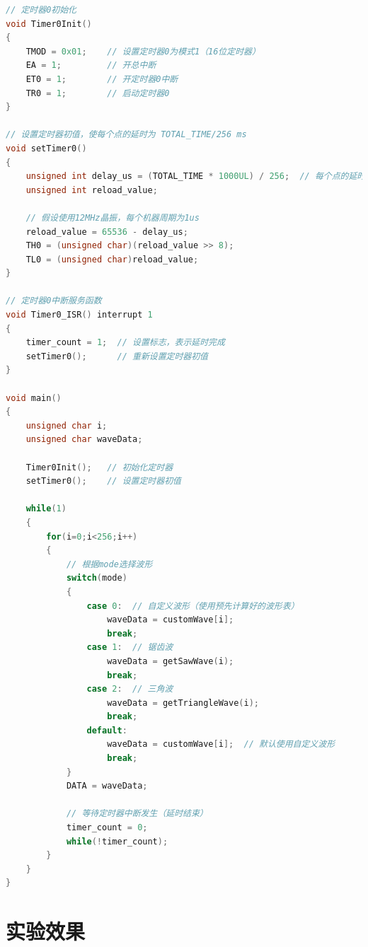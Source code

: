 \documentclass[12pt,hyperref,a4paper,UTF8]{ctexart}
\begin{document}
\begin{lstlisting}[language=C, caption={实验程序}]
// 定时器0初始化
void Timer0Init()
{
    TMOD = 0x01;    // 设置定时器0为模式1（16位定时器）
    EA = 1;         // 开总中断
    ET0 = 1;        // 开定时器0中断
    TR0 = 1;        // 启动定时器0
}

// 设置定时器初值，使每个点的延时为 TOTAL_TIME/256 ms
void setTimer0()
{
    unsigned int delay_us = (TOTAL_TIME * 1000UL) / 256;  // 每个点的延时（微秒）
    unsigned int reload_value;
    
    // 假设使用12MHz晶振，每个机器周期为1us
    reload_value = 65536 - delay_us;
    TH0 = (unsigned char)(reload_value >> 8);
    TL0 = (unsigned char)reload_value;
}

// 定时器0中断服务函数
void Timer0_ISR() interrupt 1
{
    timer_count = 1;  // 设置标志，表示延时完成
    setTimer0();      // 重新设置定时器初值
}
 
void main()
{
    unsigned char i;
    unsigned char waveData;
    
    Timer0Init();   // 初始化定时器
    setTimer0();    // 设置定时器初值
    
    while(1)
    {
        for(i=0;i<256;i++)
        {
            // 根据mode选择波形
            switch(mode)
            {
                case 0:  // 自定义波形（使用预先计算好的波形表）
                    waveData = customWave[i];
                    break;
                case 1:  // 锯齿波
                    waveData = getSawWave(i);
                    break;
                case 2:  // 三角波
                    waveData = getTriangleWave(i);
                    break;
                default:
                    waveData = customWave[i];  // 默认使用自定义波形
                    break;
            }
            DATA = waveData;
            
            // 等待定时器中断发生（延时结束）
            timer_count = 0;
            while(!timer_count); 
        }
    }
}
\end{lstlisting}

\section{实验效果}
\end{document}
